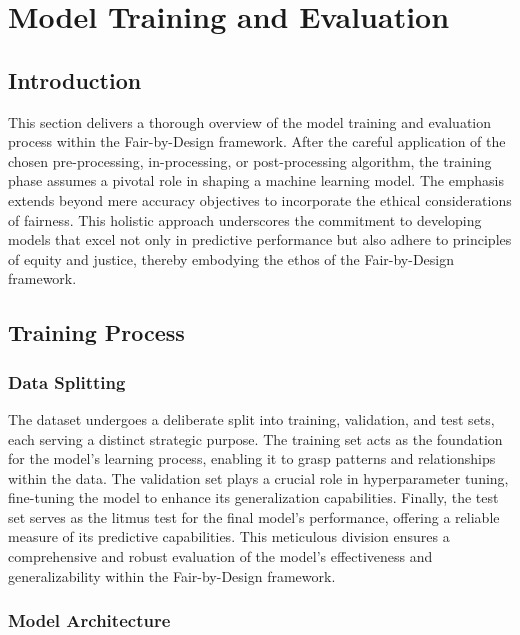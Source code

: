\section{Model Training and Evaluation}
\label{section:model-training}

\subsection{Introduction}

This section delivers a thorough overview of the model training and evaluation process within the Fair-by-Design framework. After the careful application of the chosen pre-processing, in-processing, or post-processing algorithm, the training phase assumes a pivotal role in shaping a machine learning model. The emphasis extends beyond mere accuracy objectives to incorporate the ethical considerations of fairness. This holistic approach underscores the commitment to developing models that excel not only in predictive performance but also adhere to principles of equity and justice, thereby embodying the ethos of the Fair-by-Design framework.

\subsection{Training Process}

\subsubsection{Data Splitting}

The dataset undergoes a deliberate split into training, validation, and test sets, each serving a distinct strategic purpose. The training set acts as the foundation for the model's learning process, enabling it to grasp patterns and relationships within the data. The validation set plays a crucial role in hyperparameter tuning, fine-tuning the model to enhance its generalization capabilities. Finally, the test set serves as the litmus test for the final model's performance, offering a reliable measure of its predictive capabilities. This meticulous division ensures a comprehensive and robust evaluation of the model's effectiveness and generalizability within the Fair-by-Design framework.

\subsubsection{Model Architecture}

